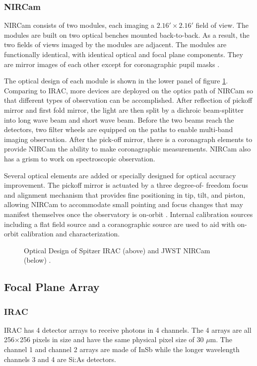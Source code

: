 \documentclass[preprint, 12pt]{aastex} \synctex=1
\begin{document}
\subsubsection{NIRCam} NIRCam consists of two modules, each imaging a
$2.16' \times 2.16'$ field of view.  The modules are built on two
optical benches mounted back-to-back. As a result, the two fields of
views imaged by the modules are adjacent.  The modules are
functionally identical, with identical optical and focal plane
components. They are mirror images of each other except for
coronagraphic pupil masks \citep{2005SPIE.5904...30H}.

The optical design of each module is shown in the lower panel of figure
\ref{fig:optics}. Comparing to IRAC, more devices are deployed on the optics path of NIRCam
so that different types of observation can be accomplished. After reflection of pickoff
mirror and first fold mirror, the light are then split by a dichroic
beam-splitter into long wave beam and short wave beam. Before the two
beams reach the detectors, two filter wheels are equipped on the paths
to enable multi-band imaging observation. After the pick-off
mirror, there is a coronagraph elements to provide NIRCam the ability
to make coronagraphic measurements. NIRCam also has a grism to work on
spectroscopic observation.

Several optical elements are added or specially designed for optical
accuracy improvement. The pickoff mirror is actuated by a three
degree-of- freedom focus and alignment mechanism that provides fine
positioning in tip, tilt, and piston, allowing NIRCam to accommodate
small pointing and focus changes that may manifest themselves once the
observatory is on-orbit \citep{2005SPIE.5904...30H}. Internal
calibration sources including a flat field source and a coranographic
source are used to aid with on-orbit calibration and characterization.


\begin{figure}
  \centering
  \caption{Optical Design of Spitzer IRAC (above)
    \citep{2004ApJS..154...10F} and JWST NIRCam (below)
    \citep{2005SPIE.5904...30H}.}
  \label{fig:optics}
\end{figure}

\subsection{Focal Plane Array}

\subsubsection{IRAC} IRAC has 4 detector arrays to receive photons in
4 channels. The 4 arrays are all 256$\times$256 pixels in size and
have the same physical pixel size of 30 $\mu$m. The channel 1 and
channel 2 arrays are made of InSb while the longer wavelength channels
3 and 4 are Si:As detectors\citep{2004ApJS..154...10F}.
\end{document}

